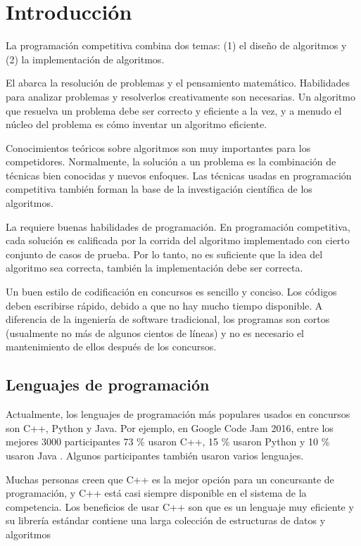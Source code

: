 \chapter{Introducci\'on}

La programaci\'on competitiva combina dos temas:
(1) el dise\~no de algoritmos y (2) la implementaci\'on
de algoritmos.

El  abarca la resoluci\'on
de problemas y el pensamiento matem\'atico.
Habilidades para analizar problemas y resolverlos
creativamente son necesarias.
Un algoritmo que resuelva un problema debe ser
correcto y eficiente a la vez, y a menudo el n\'ucleo
del problema es c\'omo inventar un algoritmo eficiente.

Conocimientos te\'oricos sobre algoritmos
son muy importantes para los competidores.
Normalmente, la soluci\'on a un problema
es la combinaci\'on de t\'ecnicas bien conocidas
y nuevos enfoques.
Las t\'ecnicas usadas en programaci\'on
competitiva tambi\'en forman la base
de la investigaci\'on cient\'ifica de los
algoritmos.

La  requiere
buenas habilidades de programaci\'on.
En programaci\'on competitiva, cada soluci\'on
es calificada por la corrida del algoritmo
implementado con cierto conjunto de casos de prueba.
Por lo tanto, no es suficiente que la idea del
algoritmo sea correcta, tambi\'en la implementaci\'on
debe ser correcta.

Un buen estilo de codificaci\'on en concursos es sencillo
y conciso. Los c\'odigos deben escribirse r\'apido,
debido a que no hay mucho tiempo disponible.
A diferencia de la ingenier\'ia de software tradicional,
los programas son cortos (usualmente no m\'as de
algunos cientos de l\'ineas) y no es necesario el
mantenimiento de ellos despu\'es de los concursos.

\section{Lenguajes de programaci\'on}


Actualmente, los lenguajes de programaci\'on m\'as
populares usados en concursos son C++, Python y Java.
Por ejemplo, en Google Code Jam 2016, entre los
mejores 3000 participantes
73 \% usaron C++,
15 \% usaron Python y
10 \% usaron Java \cite{goo16}.
Algunos participantes tambi\'en usaron varios lenguajes.

Muchas personas creen que C++ es la mejor opci\'on
para un concursante de programaci\'on,
y C++ est\'a casi siempre disponible en el
sistema de la competencia.
Los beneficios de usar C++ son que es un
lenguaje muy eficiente y su librer\'ia
est\'andar contiene una larga colecci\'on
de estructuras de datos y algoritmos


